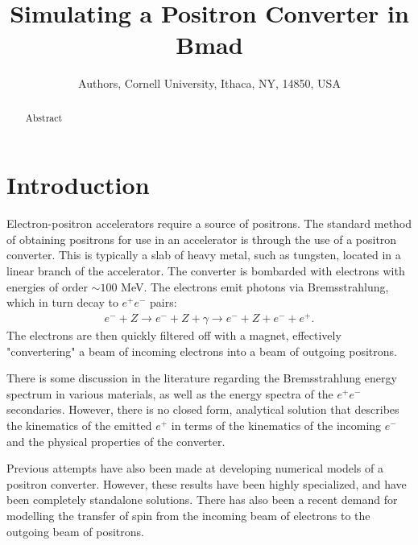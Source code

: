 \documentclass[letter,
               biblatex,     %
               keeplastbox,   %
               ]{jacow}
\begin{document}
\title{Simulating a Positron Converter in Bmad}

\author{Authors, Cornell University, Ithaca, NY, 14850, USA}

\maketitle

\begin{abstract}
Abstract
\end{abstract}

\section{Introduction}


Electron-positron accelerators require a source of positrons.
The standard method of obtaining positrons for use in an accelerator is through the use of a positron converter.
This is typically a slab of heavy metal, such as tungsten, located in a linear branch of the accelerator.
The converter is bombarded with electrons with energies of order $\sim 100$ MeV.
The electrons emit photons via Bremsstrahlung, which in turn decay to $e^+ e^-$ pairs:
\begin{align*}
e^- + Z \rightarrow e^- + Z + \gamma \rightarrow e^- + Z + e^- + e^+.
\end{align*}
The electrons are then quickly filtered off with a %
magnet, effectively "convertering" a beam of incoming electrons into a beam of outgoing positrons.

There is some discussion in the literature regarding the Bremsstrahlung energy spectrum in various materials, %
as well as the energy spectra of the $e^+ e^-$ secondaries. %
However, there is no closed form, analytical solution that describes the kinematics of the emitted $e^+$ in terms of the kinematics of the incoming $e^-$ and the physical properties of the converter.

Previous attempts have also been made at developing numerical models of a positron converter. %
However, these results have been highly specialized, and have been completely standalone solutions. %
There has also been a recent demand for modelling the transfer of spin from the incoming beam of electrons to the outgoing beam of positrons. %
\end{document}
